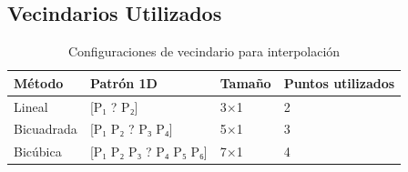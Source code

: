 \subsection{Vecindarios Utilizados}

\begin{table}[h]
\centering
\caption{Configuraciones de vecindario para interpolación}
\begin{tabular}{lp{3cm}p{3cm}p{3cm}}
\hline
\textbf{Método} & \textbf{Patrón 1D} & \textbf{Tamaño} & \textbf{Puntos utilizados} \\
\hline
Lineal & [P₁ ? P₂] & 3×1 & 2 \\
Bicuadrada & [P₁ P₂ ? P₃ P₄] & 5×1 & 3 \\
Bicúbica & [P₁ P₂ P₃ ? P₄ P₅ P₆] & 7×1 & 4 \\
\hline
\end{tabular}
\end{table}